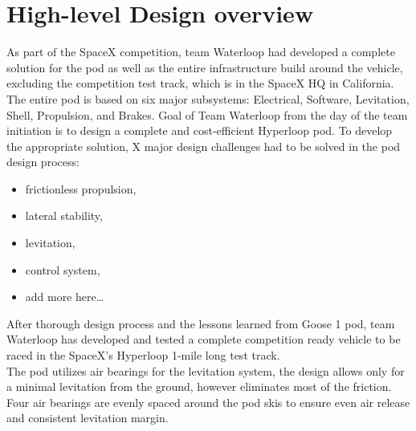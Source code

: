 \documentclass[11pt,a4paper,oldfontcommands]{memoir}
\begin{document}
																																																																										       \section{High-level Design overview}
																																																																										       As part of the SpaceX competition, team Waterloop had developed a complete solution for the pod as well as the entire infrastructure build around the vehicle, excluding the competition test track, which is in the SpaceX HQ in California.
																																																																										       The entire pod is based on six major subsystems: Electrical, Software, Levitation, Shell, Propulsion, and Brakes.
																																																																										       Goal of Team Waterloop from the day of the team initiation is to design a complete and cost-efficient Hyperloop pod. To develop the appropriate solution, X major design challenges had to be solved in the pod design process:
																																																																										       \begin{itemize}
																																																																										        \item frictionless propulsion,
																																																																											 \item lateral stability,
																																																																											  \item levitation,
																																																																											   \item control system,
																																																																											    \item add more here…
																																																																											    \end{itemize}
																																																																											    After thorough design process and the lessons learned from Goose 1 pod, team Waterloop has developed and tested a complete competition ready vehicle to be raced in the SpaceX’s Hyperloop 1-mile long test track. \\

																																																																											    The pod utilizes air bearings for the levitation system, the design allows only for a minimal levitation from the ground, however eliminates most of the friction. Four air bearings are evenly spaced around the pod skis to ensure even air release and consistent levitation margin.  \\
\end{document}
